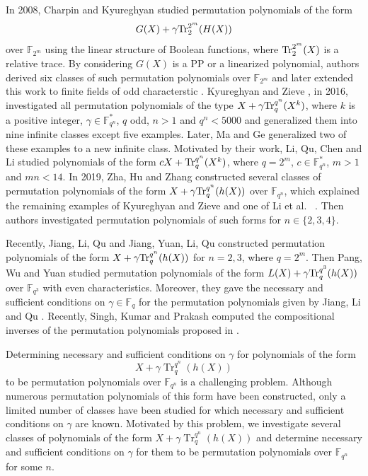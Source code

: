 \documentclass[11pt]{amsart}
\theoremstyle{plain}
\numberwithin{equation}{section}
\theoremstyle{definition}
\newcommand{\F}{\mathbb F}
\def\Tr{{\rm Tr}}
\begin{document}
In 2008, Charpin and Kyureghyan \cite{CK} studied permutation polynomials of the form $$G(X)+\gamma \Tr_{2}^{2^m}(H(X))$$ over $\F_{2^m}$ using the linear structure of Boolean functions, where $\Tr_{2}^{2^m}(X)$ is a relative trace. By considering $G(X)$ is a PP or a linearized polynomial, authors derived six classes of such permutation polynomials over $\F_{2^m}$ and later extended this work to finite fields of odd characterstic \cite{CK1}. Kyureghyan and Zieve \cite{KZ}, in 2016, investigated all permutation polynomials of the type $X+\gamma \Tr_{q}^{q^n}(X^k)$, where $k$ is a positive integer, $\gamma \in \F_{q^n}^*$, $q$ odd, $n>1$ and $q^n<5000$ and generalized them into nine infinite classes except five examples. Later, Ma and Ge \cite{MG} generalized two of these examples to a new infinite class. Motivated by their work, Li, Qu, Chen and Li \cite{LQCL} studied polynomials of the form $cX+\Tr_{q}^{q^n}(X^k)$, where $q=2^m$, $c\in \F_{q^n}^*$, $m>1$ and $mn<14$. In 2019, Zha, Hu and Zhang \cite{ZHZ} constructed several classes of permutation polynomials of the form $X+\gamma \Tr_{q}^{q^n}(h(X))$ over $\F_{q^n}$, which explained the remaining examples of Kyureghyan and Zieve \cite{KZ} and one of Li et al. ~\cite{LQCL}. Then authors \cite {ZHZ} investigated permutation polynomials of such forms for $n \in \{2,3,4\}.$

Recently, Jiang, Li, Qu\cite{ JLQ} and Jiang, Yuan, Li, Qu \cite{JYLQ} constructed permutation polynomials of the form $X+\gamma \Tr_{q}^{q^n}(h(X))$ for $n=2,3$, where $q=2^m$.  Then Pang, Wu and Yuan \cite {PWY} studied permutation polynomials of the form $L(X)+\gamma \Tr_{q}^{q^3}(h(X))$ over $\F_{q^3}$ with even characteristics. Moreover, they gave the necessary and sufficient conditions on $\gamma \in \F_q$ for the permutation polynomials given by Jiang, Li and Qu \cite{JLQ}.  Recently, Singh, Kumar and Prakash \cite{SKP} computed the compositional inverses of the permutation polynomials proposed in \cite{JYLQ}.



Determining necessary and sufficient conditions on $\gamma$ for polynomials of the form
\[
X+\gamma \operatorname{Tr}_{q}^{q^n}(h(X))
\]
to be permutation polynomials over $\mathbb{F}_{q^n}$ is a challenging problem. Although numerous permutation polynomials of this form have been constructed, only a limited number of classes have been studied for which necessary and sufficient conditions on $\gamma$ are known. Motivated by this problem, we investigate several classes of polynomials of the form
\(
X+\gamma \operatorname{Tr}_{q}^{q^n}(h(X))
\)
and determine necessary and sufficient conditions on $\gamma$ for them to be permutation polynomials over $\mathbb{F}_{q^n}$ for some $n$. 
\end{document}
